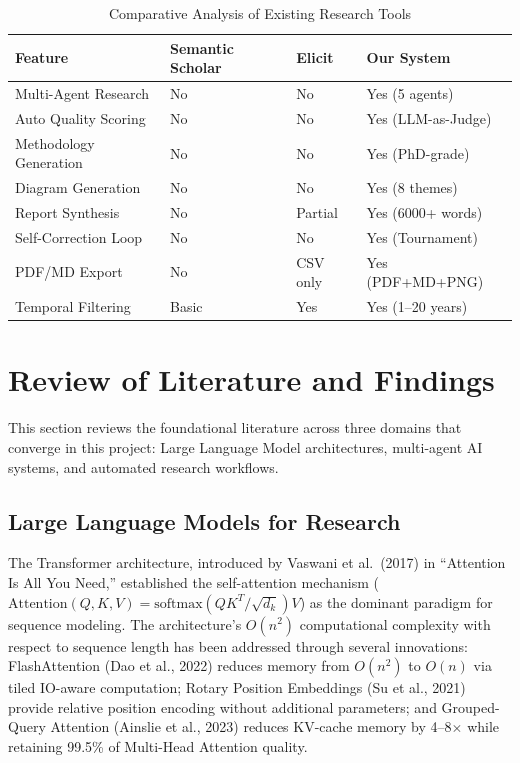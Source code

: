 \begin{table}[H]
\centering
\caption{Comparative Analysis of Existing Research Tools}
\label{tab:existing_systems}
\begin{tabularx}{\textwidth}{|l|X|X|X|}
\hline
\textbf{Feature} & \textbf{Semantic Scholar} & \textbf{Elicit} & \textbf{Our System} \\
\hline
Multi-Agent Research & No & No & Yes (5 agents) \\
\hline
Auto Quality Scoring & No & No & Yes (LLM-as-Judge) \\
\hline
Methodology Generation & No & No & Yes (PhD-grade) \\
\hline
Diagram Generation & No & No & Yes (8 themes) \\
\hline
Report Synthesis & No & Partial & Yes (6000+ words) \\
\hline
Self-Correction Loop & No & No & Yes (Tournament) \\
\hline
PDF/MD Export & No & CSV only & Yes (PDF+MD+PNG) \\
\hline
Temporal Filtering & Basic & Yes & Yes (1--20 years) \\
\hline
\end{tabularx}
\end{table}

\section{Review of Literature and Findings}

This section reviews the foundational literature across three domains that converge in this project: Large Language Model architectures, multi-agent AI systems, and automated research workflows.

\subsection{Large Language Models for Research}

The Transformer architecture, introduced by Vaswani et al.\ (2017) in ``Attention Is All You Need,'' established the self-attention mechanism ($\text{Attention}(Q,K,V) = \text{softmax}(QK^T / \sqrt{d_k})V$) as the dominant paradigm for sequence modeling. The architecture's $O(n^2)$ computational complexity with respect to sequence length has been addressed through several innovations: FlashAttention (Dao et al., 2022) reduces memory from $O(n^2)$ to $O(n)$ via tiled IO-aware computation; Rotary Position Embeddings (Su et al., 2021) provide relative position encoding without additional parameters; and Grouped-Query Attention (Ainslie et al., 2023) reduces KV-cache memory by 4--8$\times$ while retaining 99.5\% of Multi-Head Attention quality.

